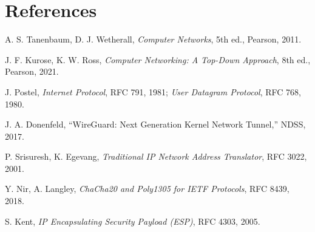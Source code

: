 \documentclass[12pt,a4paper]{article}
\begin{document}
\section*{References}
\begin{enumerate}[label={[\arabic*]}]
  \item A. S. Tanenbaum, D. J. Wetherall, \emph{Computer Networks}, 5th ed., Pearson, 2011.
  \item J. F. Kurose, K. W. Ross, \emph{Computer Networking: A Top-Down Approach}, 8th ed., Pearson, 2021.
  \item J. Postel, \emph{Internet Protocol}, RFC 791, 1981; \emph{User Datagram Protocol}, RFC 768, 1980.
  \item J. A. Donenfeld, ``WireGuard: Next Generation Kernel Network Tunnel,'' NDSS, 2017.
  \item P. Srisuresh, K. Egevang, \emph{Traditional IP Network Address Translator}, RFC 3022, 2001.
  \item Y. Nir, A. Langley, \emph{ChaCha20 and Poly1305 for IETF Protocols}, RFC 8439, 2018.
  \item S. Kent, \emph{IP Encapsulating Security Payload (ESP)}, RFC 4303, 2005.
\end{enumerate}
\end{document}

